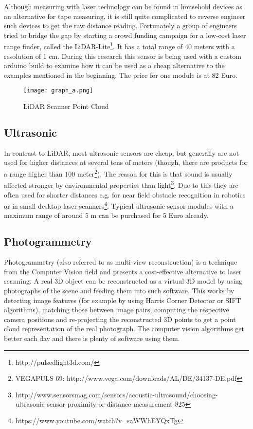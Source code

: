 Although measuring with laser technology can be found in household devices as an alternative for tape measuring, it is still quite complicated to reverse engineer such devices to get the raw distance reading. Fortunately a group of engineers tried to bridge the gap by starting a crowd funding campaign for a low-cost laser range finder, called the LiDAR-Lite\footnote{http://pulsedlight3d.com/}. It has a total range of 40 meters with a resolution of 1 cm. During this research this sensor is being used with a custom arduino build to examine how it can be used as a cheap alternative to the examples mentioned in the beginning. The price for one module is at 82 Euro.

\begin{figure}[h]
	\centering
	\texttt{[image: graph\_a.png]}
	\caption{LiDAR Scanner Point Cloud}
	\label{fig:LiDAR}
\end{figure}

\subsection{Ultrasonic}

In contrast to LiDAR, most ultrasonic sensors are cheap, but generally are not used for higher distances at several tens of meters (though, there are products for a range higher than 100 meter\footnote{VEGAPULS 69: http://www.vega.com/downloads/AL/DE/34137-DE.pdf}). The reason for this is that sound is usually affected stronger by environmental properties than light\footnote{http://www.sensorsmag.com/sensors/acoustic-ultrasound/choosing-ultrasonic-sensor-proximity-or-distance-measurement-825}. Due to this they are often used for shorter distances e.g. for near field obstacle recognition in robotics or in small desktop laser scanners\footnote{https://www.youtube.com/watch?v=saWWhEYQxTg}. Typical ultrasonic sensor modules with a maximum range of around 5 m can be purchased for 5 Euro already.



\subsection{Photogrammetry}

Photogrammetry (also referred to as multi-view reconstruction) is a technique from the Computer Vision field and presents a cost-effective alternative to laser scanning. A real 3D object can be reconstructed as a virtual 3D model by using photographs of the scene and feeding them into such software. This works by detecting image features (for example by using Harris Corner Detector or SIFT algorithms), matching those between image pairs, computing the respective camera positions and re-projecting the reconstructed 3D points to get a point cloud representation of the real photograph\parencite[compare][p10]{bookProgrammingComputerVisionwithPython}.
The computer vision algorithms get better each day and there is plenty of software using them.

